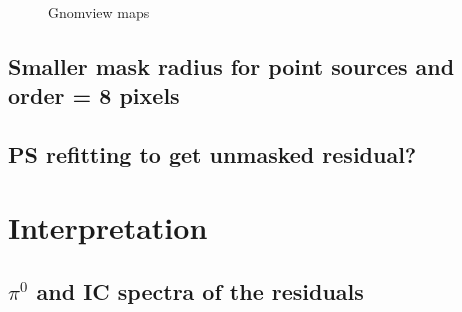 \documentclass[a4paper]{article}
\begin{document}
\begin{figure}[h]
{\begin{subfigure}[b]{.5\textwidth}
	\end{subfigure}%
	}\\
\caption{Gnomview maps}
\label{Fit_IC_pi0_to_ROI}
\end{figure}







\subsection{Smaller mask radius for point sources and order = 8 pixels}

\subsection{PS refitting to get unmasked residual?}


\section{Interpretation}

\subsection{$\pi^0$ and IC spectra of the residuals}
\end{document}
